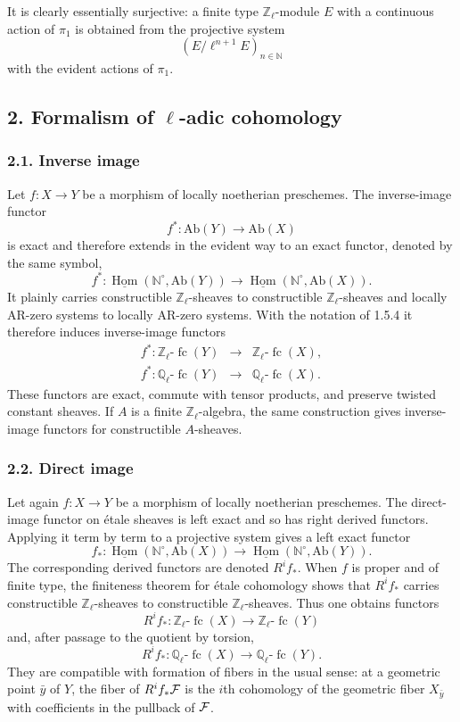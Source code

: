 \documentclass[11pt]{article}
\theoremstyle{plain}
\theoremstyle{definition}
\theoremstyle{remark}
\newcommand{\bN}{\mathbb N}
\newcommand{\bQ}{\mathbb Q}
\newcommand{\bZ}{\mathbb Z}
\DeclareMathOperator{\Hom}{Hom}
\providecommand{\fc}{\operatorname{fc}}
\begin{document}
It is clearly essentially surjective: a finite type $\bZ_\ell$-module $E$ with a
continuous action of $\pi_1$ is obtained from the projective system
\[
       (E/\ell^{n+1}E)_{n\in\bN}
\]
with the evident actions of $\pi_1$.

\subsection*{2. Formalism of $\ell$-adic cohomology}

\subsubsection*{2.1. Inverse image}

Let $f:X\to Y$ be a morphism of locally noetherian preschemes. The inverse-image
functor
\[
      f^*:\mathrm{Ab}(Y)\longrightarrow \mathrm{Ab}(X)
\]
is exact and therefore extends in the evident way to an exact functor, denoted by the
same symbol,
\[
      f^*:\underline{\Hom}(\bN^\circ,\mathrm{Ab}(Y))
      \longrightarrow\underline{\Hom}(\bN^\circ,\mathrm{Ab}(X)).
\]
It plainly carries constructible $\bZ_\ell$-sheaves to constructible
$\bZ_\ell$-sheaves and locally AR-zero systems to locally AR-zero systems. With the
notation of 1.5.4 it therefore induces inverse-image functors
\[
\begin{array}{rcl}
 f^*:\bZ_\ell\text{-}\fc(Y)&\longrightarrow&\bZ_\ell\text{-}\fc(X),\\[3pt]
 f^*:\bQ_\ell\text{-}\fc(Y)&\longrightarrow&\bQ_\ell\text{-}\fc(X).
\end{array}
\]
These functors are exact, commute with tensor products, and preserve twisted
constant sheaves. If $A$ is a finite $\bZ_\ell$-algebra, the same construction gives
inverse-image functors for constructible $A$-sheaves.

\subsubsection*{2.2. Direct image}

Let again $f:X\to Y$ be a morphism of locally noetherian preschemes. The direct-image
functor on étale sheaves is left exact and so has right derived functors. Applying it
term by term to a projective system gives a left exact functor
\[
      f_*:\underline{\Hom}(\bN^\circ,\mathrm{Ab}(X))
      \longrightarrow\underline{\Hom}(\bN^\circ,\mathrm{Ab}(Y)).
\]
The corresponding derived functors are denoted $R^if_*$. When $f$ is proper and of
finite type, the finiteness theorem for étale cohomology shows that $R^if_*$ carries
constructible $\bZ_\ell$-sheaves to constructible $\bZ_\ell$-sheaves. Thus one obtains
functors
\[
      R^if_*:\bZ_\ell\text{-}\fc(X)\longrightarrow \bZ_\ell\text{-}\fc(Y)
\]
and, after passage to the quotient by torsion,
\[
      R^if_*:\bQ_\ell\text{-}\fc(X)\longrightarrow \bQ_\ell\text{-}\fc(Y).
\]
They are compatible with formation of fibers in the usual sense: at a geometric point
$\bar y$ of $Y$, the fiber of $R^if_*\mathcal F$ is the $i$th cohomology of the geometric
fiber $X_{\bar y}$ with coefficients in the pullback of $\mathcal F$.
\end{document}
